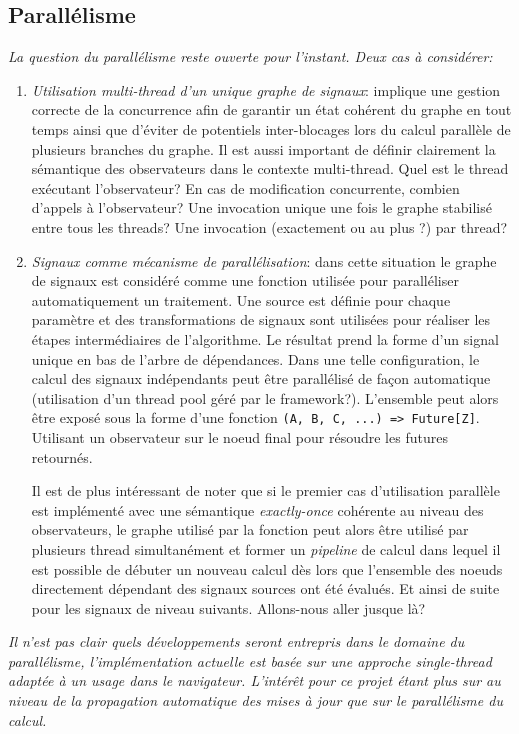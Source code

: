 \subsection{Parallélisme}
\textit{La question du parallélisme reste ouverte pour l'instant. Deux cas à considérer:}
\begin{enumerate}
	\item \emph{Utilisation multi-thread d'un unique graphe de signaux}: implique une gestion correcte de la concurrence afin de garantir un état cohérent du graphe en tout temps ainsi que d'éviter de potentiels inter-blocages lors du calcul parallèle de plusieurs branches du graphe. Il est aussi important de définir clairement la sémantique des observateurs dans le contexte multi-thread. Quel est le thread exécutant l'observateur? En cas de modification concurrente, combien d'appels à l'observateur? Une invocation unique une fois le graphe stabilisé entre tous les threads? Une invocation (exactement ou au plus ?) par thread?
	\item \emph{Signaux comme mécanisme de parallélisation}: dans cette situation le graphe de signaux est considéré comme une fonction utilisée pour paralléliser automatiquement un traitement. Une source est définie pour chaque paramètre et des transformations de signaux sont utilisées pour réaliser les étapes intermédiaires de l'algorithme. Le résultat prend la forme d'un signal unique en bas de l'arbre de dépendances. Dans une telle configuration, le calcul des signaux indépendants peut être parallélisé de façon automatique (utilisation d'un thread pool géré par le framework?). L'ensemble peut alors être exposé sous la forme d'une fonction \texttt{(A, B, C, ...) => Future[Z]}. Utilisant un observateur sur le noeud final pour résoudre les futures retournés.
	
	Il est de plus intéressant de noter que si le premier cas d'utilisation parallèle est implémenté avec une sémantique \emph{exactly-once} cohérente au niveau des observateurs, le graphe utilisé par la fonction peut alors être utilisé par plusieurs thread simultanément et former un \emph{pipeline} de calcul dans lequel il est possible de débuter un nouveau calcul dès lors que l'ensemble des noeuds directement dépendant des signaux sources ont été évalués. Et ainsi de suite pour les signaux de niveau suivants. Allons-nous aller jusque là?
\end{enumerate}

\textit{Il n'est pas clair quels développements seront entrepris dans le domaine du parallélisme, l'implémentation actuelle est basée sur une approche single-thread adaptée à un usage dans le navigateur. L'intérêt pour ce projet étant plus sur au niveau de la propagation automatique des mises à jour que sur le parallélisme du calcul.}
